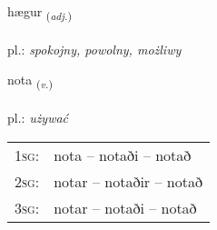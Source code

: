 \documentclass[frontgrid, backgrid]{flacards}\usepackage[]{graphicx}\usepackage[]{xcolor}
\begin{document}
{hægur \small{\textsubscript{(\textit{adj.})}} \\[1ex] %
\textphonetic{[haiːɣʏr]} \\
pl.: \emph{spokojny, powolny, możliwy} \\  [2ex]
\renewcommand*{\arraystretch}{0.8}
}

\renewcommand{\flhead}{\vskip5pt \fboxsep=0pt {\small\bfseries\footnotesize Sagnorð | czasownik}}
\renewcommand{\fcfoot}{\vskip5pt \fboxsep=0pt \hspace{2pt}{\small\bfseries\footnotesize 1K}}

\renewcommand{\blhead}{\vskip5pt {\small\bfseries\footnotesize Sagnorð | czasownik }}
\renewcommand{\bcfoot}{\vskip5pt \hspace{2pt}{\small\bfseries\footnotesize 1K}}


{nota \small{\textsubscript{(\textit{v.})}} \\[1ex] %
\textphonetic{[nɔːta]} \\
pl.: \emph{używać} \\  [2ex]
\renewcommand*{\arraystretch}{0.8}
\begin{tabular}{p{1cm}l}
\textsc{1sg}: & nota -- notaði -- notað \\ 
\textsc{2sg}: & notar -- notaðir -- notað \\ 
\textsc{3sg}: & notar -- notaði -- notað \\ 
\end{tabular}
}

\renewcommand{\flhead}{\vskip5pt \fboxsep=0pt {\small\bfseries\footnotesize Fornafn | zaimek}}
\renewcommand{\fcfoot}{\vskip5pt \fboxsep=0pt \hspace{2pt}{\small\bfseries\footnotesize 1K}}
\end{document}
